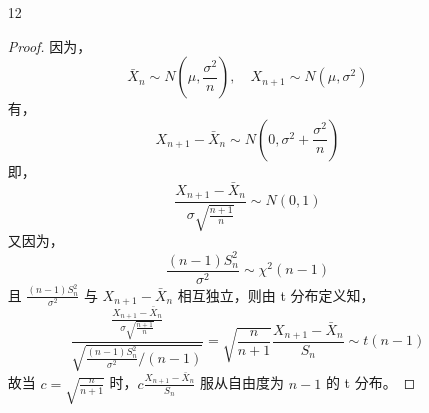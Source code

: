 \documentclass[normal,cn]{elegantnote}
\begin{document}
\begin{enumerate}
\begin{proof}
\begin{equation*}
            \end{equation*}
        \end{proof}
    \item[12]
        \begin{proof}
            因为，
            \begin{equation*}
                \bar{X}_{n}\sim N\left(\mu,\frac{\sigma^{2}}{n}\right),\quad X_{n+1}\sim N\left(\mu,\sigma^{2}\right)
            \end{equation*}
            有，
            \begin{equation*}
                X_{n+1}-\bar{X}_{n}\sim N\left(0,\sigma^{2}+\frac{\sigma^{2}}{n}\right)
            \end{equation*}
            即，
            \begin{equation*}
                \frac{X_{n+1}-\bar{X}_{n}}{\sigma\sqrt{\frac{n+1}{n}}}\sim N(0,1)
            \end{equation*}
            又因为，
            \begin{equation*}
                \frac{(n-1)S_{n}^{2}}{\sigma^{2}}\sim\chi^{2}(n-1)
            \end{equation*}
            且 $\frac{(n-1)S_{n}^{2}}{\sigma^{2}}$ 与 $X_{n+1}-\bar{X}_{n}$ 相互独立，则由 t 分布定义知，
            \begin{equation*}
                \frac{\frac{X_{n+1}-\bar{X}_{n}}{\sigma\sqrt{\frac{n+1}{n}}}}{\sqrt{\frac{(n-1)S_{n}^{2}}{\sigma^{2}}/(n-1)}}=\sqrt{\frac{n}{n+1}}\frac{X_{n+1}-\bar{X}_{n}}{S_{n}}\sim t(n-1)
            \end{equation*}
            故当 $c=\sqrt{\frac{n}{n+1}}$ 时，$c\frac{X_{n+1}-\bar{X}_{n}}{S_{n}}$ 服从自由度为 $n-1$ 的 t 分布。
        \end{proof}
\end{enumerate}
\end{document}
